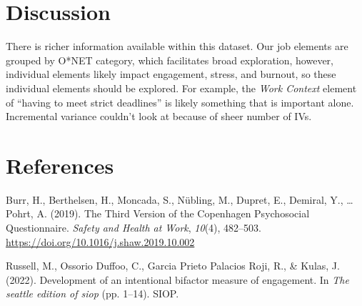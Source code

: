 \documentclass[
  english,
  man]{apa6}
\begin{document}
\hypertarget{discussion}{%
\section{Discussion}\label{discussion}}

There is richer information available within this dataset. Our job elements are grouped by O*NET category, which facilitates broad exploration, however, individual elements likely impact engagement, stress, and burnout, so these individual elements should be explored. For example, the \emph{Work Context} element of \enquote{having to meet strict deadlines} is likely something that is important alone. Incremental variance couldn't look at because of sheer number of IVs.

\newpage

\hypertarget{references}{%
\section{References}\label{references}}

\begingroup
\setlength{\parindent}{-0.5in}
\setlength{\leftskip}{0.5in}

\hypertarget{refs}{}
\leavevmode\hypertarget{ref-burr_third_2019}{}%
Burr, H., Berthelsen, H., Moncada, S., Nübling, M., Dupret, E., Demiral, Y., \ldots{} Pohrt, A. (2019). The Third Version of the Copenhagen Psychosocial Questionnaire. \emph{Safety and Health at Work}, \emph{10}(4), 482--503. \url{https://doi.org/10.1016/j.shaw.2019.10.002}

\leavevmode\hypertarget{ref-engage_2022}{}%
Russell, M., Ossorio Duffoo, C., Garcia Prieto Palacios Roji, R., \& Kulas, J. (2022). Development of an intentional bifactor measure of engagement. In \emph{The seattle edition of siop} (pp. 1--14). SIOP.

\endgroup
\end{document}
